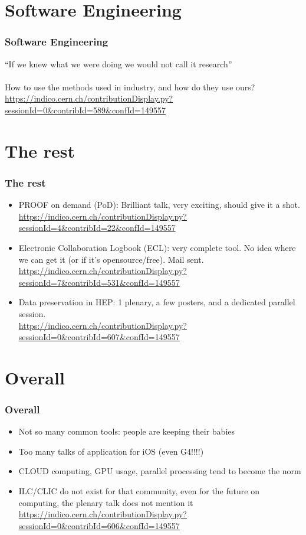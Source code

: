 \documentclass[handout]{beamer}
\begin{document}
\section{Software Engineering}
\begin{frame}
\frametitle{Software Engineering}
``If we knew what we were doing we would not call it research''\\

~\\

How to use the methods used in industry, and how do they use ours?\\
{\tiny
\url{https://indico.cern.ch/contributionDisplay.py?sessionId=0&contribId=589&confId=149557}}
\end{frame}

\section{The rest}
\begin{frame}
\frametitle{The rest}
\begin{itemize}
  \item PROOF on demand (PoD): Brilliant talk, very exciting, should give it a
  shot.\\ {\tiny
  \url{https://indico.cern.ch/contributionDisplay.py?sessionId=4&contribId=22&confId=149557}}
  \item Electronic Collaboration Logbook (ECL): very complete tool. No idea
  where we can get it (or if it's opensource/free). Mail sent.\\
  {\tiny
  \url{https://indico.cern.ch/contributionDisplay.py?sessionId=7&contribId=531&confId=149557}}
  \item Data preservation in HEP: 1 plenary, a few posters, and a dedicated
  parallel session.\\
  {\tiny
  \url{https://indico.cern.ch/contributionDisplay.py?sessionId=0&contribId=607&confId=149557}}
\end{itemize}
\end{frame}

\section{Overall}
\begin{frame}
\frametitle{Overall}
\begin{itemize}
  \item Not so many common tools: people are keeping their babies
  \item Too many talks of application for iOS (even G4!!!!)
  \item CLOUD computing, GPU usage, parallel processing tend to become the norm
  \item ILC/CLIC do not exist for that community, even for the future on
  computing, the plenary talk does not mention it\\
  {\tiny
  \url{https://indico.cern.ch/contributionDisplay.py?sessionId=0&contribId=606&confId=149557}}
\end{itemize}
\end{frame}
\end{document}
